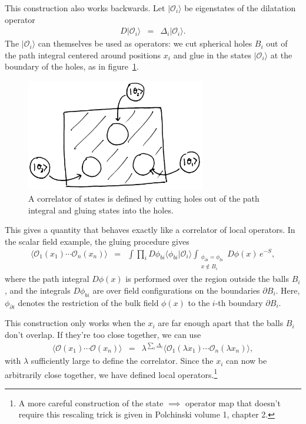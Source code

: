 \documentclass[11pt]{ws-rv9x6}
\newcommand\be{\begin{eqnarray}}
\newcommand\ee{\end{eqnarray}}
\newcommand\cO{\mathcal{O}}
\newcommand\ptl\partial
\newcommand\<\langle
\renewcommand\>\rangle
\renewcommand\.{\cdot}
\newcommand\De{\Delta}
\renewcommand\l\lambda
\begin{document}
This construction also works backwards. Let $|\cO_i\>$ be eigenstates of the dilatation operator
\be
D |\cO_i\> &=& \De_i |\cO_i\>.
\ee
The $|\cO_i\>$ can themselves be used as operators: we cut spherical holes $B_i$ out of the path integral centered around positions $x_i$ and glue in the states $|\cO_i\>$ at the boundary of the holes, as in figure~\ref{fig:correlatorofstates}.
\begin{figure}
\begin{center}
\includegraphics[width=0.7\textwidth]{correlatorofstates.jpg}
\end{center}
\caption{A correlator of states is defined by cutting holes out of the path integral and gluing states into the holes.  \label{fig:correlatorofstates}}
\end{figure}
This gives a quantity that behaves exactly like a correlator of local operators.
In the scalar field example, the gluing procedure gives
\be
\<\cO_1(x_1)\cdots \cO_n(x_n)\> &=& \int \prod_i D\phi_{bi} \<\phi_{bi}|\cO_i\> \int_{\substack{\phi_{\ptl i}=\phi_{bi}\\ x \notin B_i }} D\phi(x)\, e^{-S},
\ee
where the path integral $D\phi(x)$ is performed over the region outside the balls $B_i$, and the integrals $D\phi_{bi}$ are over field configurations on the boundaries $\ptl B_i$. Here, $\phi_{\ptl i}$ denotes the restriction of the bulk field $\phi(x)$ to the $i$-th boundary $\ptl B_i$.

This construction only works when the $x_i$ are far enough apart that the balls $B_i$ don't overlap.  If they're too close together, we can use
\be
\<\cO(x_1)\cdots \cO(x_n)\> &=& \lambda^{\sum_i \Delta_i}\<\cO_1(\lambda x_1)\cdots \cO_n(\lambda x_n)\>,
\ee
with $\l$ sufficiently large to define the correlator.  Since the $x_i$ can now be arbitrarily close together, we have defined local operators.\footnote{A more careful construction of the state $\implies$ operator map that doesn't require this rescaling trick is given in Polchinski \cite{Polchinski:1998rq} volume 1, chapter 2.}
\end{document}
